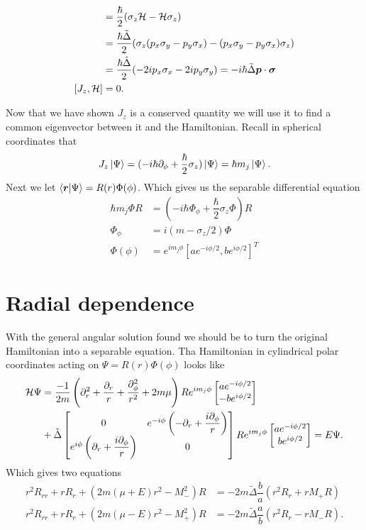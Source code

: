 \begin{align*}
  [S_z,\Ham] &= \dfrac{\hbar}{2}(\sigma_z\Ham - \Ham\sigma_z) \\
  &= \dfrac{\hbar\tilde{\Delta}}{2}(\sigma_z(p_x\sigma_y - p_y\sigma_x) - (p_x\sigma_y - p_y\sigma_x)\sigma_z) \\
  &= \dfrac{\hbar\tilde{\Delta}}{2}(-2ip_x\sigma_x - 2ip_y\sigma_y) = -i\hbar\tilde{\Delta}\bm{p}\cdot\bm{\sigma} \\
  [J_z,\Ham] &= 0.
\end{align*}

Now that we have shown $J_z$ is a conserved quantity we will use it to find a common eigenvector between it and the Hamiltonian.
Recall in spherical coordinates that 
\begin{equation}
  J_z\ket{\Psi} = (-i\hbar\partial_{\phi} + \dfrac{\hbar}{2}\sigma_z)\ket{\Psi} =  \hbar m_j\ket{\Psi}.
\end{equation}
Next we let $\bra{\bm{r}}\ket{\Psi} = R(r)\Phi(\phi)$.
Which gives us the separable differential equation
\begin{align*}
  \hbar m_j \Phi R &= (-i\hbar\Phi_{\phi}+\dfrac{\hbar}{2}\sigma_z\Phi)R \\
  \Phi_{\phi} &= i(m-\sigma_z/2)\Phi \\
  \Phi(\phi) &= e^{im_j\phi} [ a e^{-i\phi/2}, b e^{i\phi/2} ]^T
\end{align*}

\section{Radial dependence}

With the general angular solution found we should be to turn the original Hamiltonian into a separable equation. Tha Hamiltonian in cylindrical polar coordinates acting on $\Psi = R(r)\Phi(\phi)$ looks like
\begin{align*}
  \mathcal{H}\Psi &= \dfrac{-1}{2m}\left(\partial_r^2 + \dfrac{\partial_r}{r} + \dfrac{\partial_{\phi}^2}{r^2} + 2m\mu\right) R e^{im_j\phi}
  \begin{bmatrix}
    ae^{-i\phi/2} \\
    -be^{i\phi/2}
  \end{bmatrix} \\
  &+\tilde{\Delta}
  \begin{bmatrix}
    0 & e^{-i\phi}\left(-\partial_r + \dfrac{i\partial_{\phi}}{r}\right) \\
    e^{i\phi}\left(\partial_r + \dfrac{i\partial_{\phi}}{r}\right) & 0
  \end{bmatrix} R e^{im_j\phi}
  \begin{bmatrix}
    ae^{-i\phi/2} \\
    be^{i\phi/2}
  \end{bmatrix}  = E\Psi.
\end{align*}
Which gives two equations
\begin{align}
  r^2R_{rr} + rR_r + (2m(\mu+E)r^2-M_-^2)R &= -2m\tilde{\Delta}\dfrac{b}{a}(r^2R_r+rM_+R) \\
  r^2R_{rr} + rR_r + (2m(\mu-E)r^2-M_+^2)R &= -2m\tilde{\Delta}\dfrac{a}{b}(r^2R_r-rM_-R).
\end{align}
